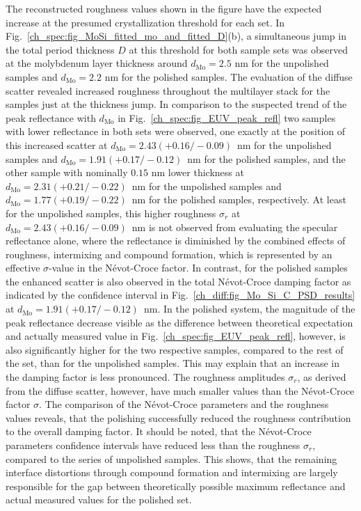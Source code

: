 The reconstructed roughness values shown in the figure have the expected increase at the presumed crystallization threshold for each set. In Fig.~\ref{ch_spec:fig_MoSi_fitted_mo_and_fitted_D}(b), a simultaneous jump in the total period thickness $D$ at this threshold for both sample sets was observed at the molybdenum layer thickness around $d_\text{Mo} = 2.5$ nm for the unpolished samples and $d_\text{Mo} = 2.2$ nm for the polished samples. The evaluation of the diffuse scatter revealed increased roughness throughout the multilayer stack for the samples just at the thickness jump. In comparison to the suspected trend of the peak reflectance with $d_\text{Mo}$ in Fig.~\ref{ch_spec:fig_EUV_peak_refl} two samples with lower reflectance in both sets were observed, one exactly at the position of this increased scatter at $d_\text{Mo}=2.43(+0.16/-0.09)$~nm for the unpolished samples and $d_\text{Mo}=1.91(+0.17/-0.12)$~nm for the polished samples, and the other sample with nominally $0.15$ nm lower thickness at $d_\text{Mo}=2.31(+0.21/-0.22)$~nm for the unpolished samples and $d_\text{Mo}=1.77(+0.19/-0.22)$~nm for the polished samples, respectively. At least for the unpolished samples, this higher roughness $\sigma_r$ at $d_\text{Mo}=2.43(+0.16/-0.09)$~nm is not observed from evaluating the specular reflectance alone, where the reflectance is diminished by the combined effects of roughness, intermixing and compound formation, which is represented by an effective $\sigma$-value in the N\'{e}vot-Croce factor. In contrast, for the polished samples the enhanced scatter is also observed in the total N\'{e}vot-Croce damping factor as indicated by the confidence interval in Fig.~\ref{ch_diff:fig_Mo_Si_C_PSD_results} at $d_\text{Mo}=1.91(+0.17/-0.12)$~nm. In the polished system, the magnitude of the peak reflectance decrease visible as the difference between theoretical expectation and actually measured value in Fig.~\ref{ch_spec:fig_EUV_peak_refl}, however, is also significantly higher for the two respective samples, compared to the rest of the set, than for the unpolished samples. This may explain that an increase in the damping factor is less pronounced. The roughness amplitudes $\sigma_r$, as derived from the diffuse scatter, however, have much smaller values than the N\'{e}vot-Croce factor $\sigma$. The comparison of the N\'{e}vot-Croce parameters and the roughness values reveals, that the polishing successfully reduced the roughness contribution to the overall damping factor. It should be noted, that the N\'{e}vot-Croce parameters confidence intervals have reduced less than the roughness $\sigma_r$, compared to the series of unpolished samples. This shows, that the remaining interface distortions through compound formation and intermixing are largely responsible for the gap between theoretically possible maximum reflectance and actual measured values for the polished set.


